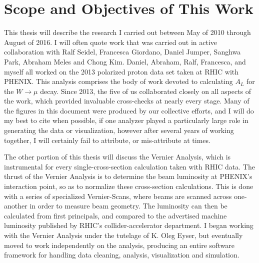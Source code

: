 \section{Scope and Objectives of This Work} This thesis will describe the
research I carried out between May of 2010 through August of 2016. I will often
quote work that was carried out in active collaboration with Ralf Seidel,
Francesca Giordano, Daniel Jumper, Sanghwa Park, Abraham Meles and Chong Kim.
Daniel, Abraham, Ralf, Francesca, and myself all worked on the 2013 polarized
proton data set taken at RHIC with PHENIX. This analysis comprises the body of
work devoted to calculating $A_L$ for the $W\rightarrow\mu$ decay. Since 2013,
the five of us collaborated closely on all aspects of the work, which provided
invaluable cross-checks at nearly every stage. Many of the figures in this
document were produced by our collective efforts, and I will do my best to cite
when possible, if one analyzer played a particularly large role in generating
the data or visualization, however after several years of working together, I
will certainly fail to attribute, or mis-attribute at times.

The other portion of this thesis will discuss the Vernier Analysis, which is
instrumental for every single-cross-section calculation taken with RHIC data.
The thrust of the Vernier Analysis is to determine the beam luminosity at
PHENIX's interaction point, so as to normalize these cross-section calculations.
This is done with a series of specialized Vernier-Scans, where beams are scanned
across one-another in order to measure beam geometry. The luminosity can then be
calculated from first principals, and compared to the advertised machine
luminosity published by RHIC's collider-accelerator department. I began working
with the Vernier Analysis under the tutelage of K. Oleg Eyser, but eventually
moved to work independently on the analysis, producing an entire software
framework for handling data cleaning, analysis, visualization and simulation.
